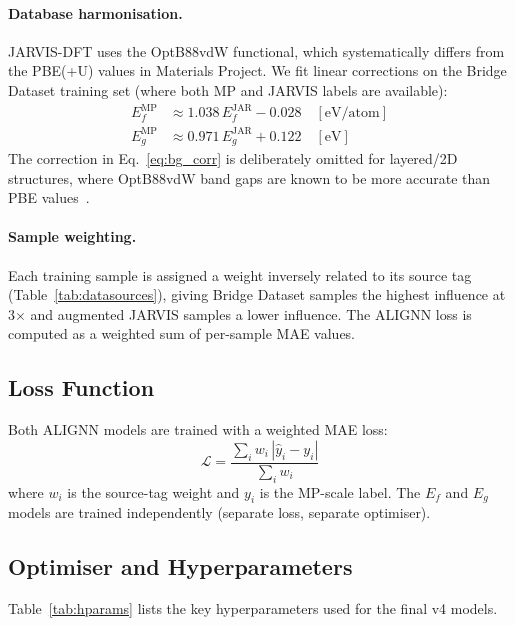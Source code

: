 \documentclass[10pt, a4paper]{article}
\begin{document}
\paragraph{Database harmonisation.}
JARVIS-DFT uses the OptB88vdW functional, which systematically differs
from the PBE(+U) values in Materials Project.
We fit linear corrections on the Bridge Dataset training set (where
both MP and JARVIS labels are available):
\begin{align}
  E_f^{\text{MP}} &\approx 1.038\,E_f^{\text{JAR}} - 0.028
    \quad [\text{eV/atom}] \label{eq:ef_corr}\\
  E_g^{\text{MP}} &\approx 0.971\,E_g^{\text{JAR}} + 0.122
    \quad [\text{eV}] \label{eq:bg_corr}
\end{align}
The correction in Eq.~\eqref{eq:bg_corr} is deliberately omitted for
layered/2D structures, where OptB88vdW band gaps are known to be more
accurate than PBE values~\cite{marzari2012}.

\paragraph{Sample weighting.}
Each training sample is assigned a weight inversely related to its
source tag (Table~\ref{tab:datasources}), giving Bridge Dataset samples
the highest influence at 3$\times$ and augmented JARVIS samples a
lower influence.
The ALIGNN loss is computed as a weighted sum of per-sample MAE values.

\subsection{Loss Function}

Both ALIGNN models are trained with a weighted MAE loss:
\[
  \mathcal{L} = \frac{\sum_i w_i \,|\hat{y}_i - y_i|}{\sum_i w_i}
\]
where $w_i$ is the source-tag weight and $y_i$ is the MP-scale label.
The $E_f$ and $E_g$ models are trained independently (separate loss,
separate optimiser).

\subsection{Optimiser and Hyperparameters}

Table~\ref{tab:hparams} lists the key hyperparameters used for the
final v4 models.
\end{document}
